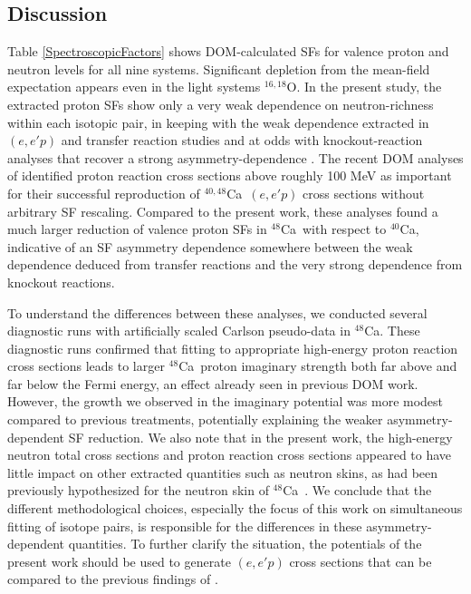 \documentclass[twocolumn,secnumarabic,amssymb, nobibnotes, aps, prl,
superscriptaddress, nobalancelastpage, floatfix]{revtex4}
\newcommand{\oSixEight}{\ensuremath{^{16,18}}O}
\newcommand{\caForty}{\ensuremath{^{40}}C\lowercase{a}}
\newcommand{\caEight}{\ensuremath{^{48}}C\lowercase{a}}
\newcommand{\caAughtEight}{\ensuremath{^{40,48}}C\lowercase{a}}
\begin{document}
\subsection{Discussion}
Table \ref{SpectroscopicFactors} shows DOM-calculated SFs for 
valence proton and neutron levels for all nine systems. Significant depletion from the mean-field expectation
appears even in the light systems \oSixEight. In the present study, the extracted proton SFs
show only a very weak dependence on neutron-richness within each isotopic pair,
in keeping with the weak dependence extracted in $(e,e'p)$ and transfer reaction studies
and at odds with knockout-reaction analyses that recover a strong asymmetry-dependence
\cite{Tostevin2014, Dickhoff2018}.
The recent DOM analyses of \cite{Atkinson2018, Atkinson2019} identified proton reaction cross sections above roughly 100 MeV as 
important for their successful reproduction of \caAughtEight\ $(e,e'p)$ cross sections without arbitrary SF rescaling. Compared to the
present work, these analyses found a much larger reduction of valence proton
SFs in \caEight\ with respect to \caForty, indicative of an SF asymmetry dependence somewhere between the weak
dependence deduced from transfer reactions and the very strong dependence from knockout reactions. 

To understand the differences between these analyses, we conducted several diagnostic runs with artificially
scaled Carlson pseudo-data in \caEight. These diagnostic runs confirmed that fitting to appropriate
high-energy proton reaction cross sections leads to larger \caEight\ proton imaginary strength both far above and far below the
Fermi energy, an effect already seen in previous DOM work. However, the growth we observed in the imaginary potential was
more modest compared to previous treatments, potentially explaining the weaker asymmetry-dependent
SF reduction. We also note that in the present
work, the high-energy neutron total cross sections and proton reaction cross sections appeared to have
little impact on other extracted quantities such as neutron skins, as had been previously hypothesized
for the neutron skin of \caEight\ \cite{Mahzoon2017}. We conclude that the different
methodological choices, especially the focus of this work on simultaneous fitting of isotope pairs,
is responsible for the differences in these asymmetry-dependent quantities. To further clarify the
situation, the potentials of the present work should be used to generate $(e,e'p)$ cross
sections that can be compared to the previous findings of \cite{Atkinson2019}.
\end{document}

